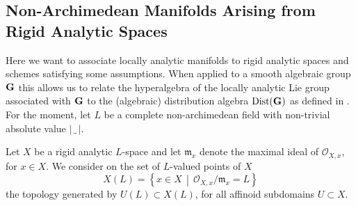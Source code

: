 \documentclass[a4paper, reqno, 10pt]{amsart}
\theoremstyle{definition}
\numberwithin{equation}{section}
\newcommand{\abs}[1]{{\lvert{#1}\rvert}}
\newcommand{\blank}{{\,\_\,}}
\let\originalmiddle\middle
\renewcommand{\middle}[1]{\,\originalmiddle#1\,}
\newcommand{\CO}{{\mathcal {O}}}
\newcommand{\bG}{{\mathrm{\bf G}}}
\newcommand{\Fm}{{\mathfrak {m}}}
\begin{document}
\subsection{Non-Archimedean Manifolds Arising from Rigid Analytic Spaces}


Here we want to associate locally analytic manifolds to rigid analytic spaces and schemes satisfying some assumptions.
When applied to a smooth algebraic group $\bG$ this allows us to relate the hyperalgebra of the locally analytic Lie group associated with $\bG$ to the (algebraic) distribution algebra ${\rm Dist}(\bG)$ as defined in \cite[I.\ \S 7.7]{Jantzen03RepAlgGrp}.
For the moment, let $L$ be a complete non-archimedean field with non-trivial absolute value $\abs{\blank}$.



Let $X$ be a rigid analytic $L$-space and let $\Fm_x$ denote the maximal ideal of $\CO_{X,x}$, for $x\in X$.
We consider on the set of $L$-valued points of $X$
\begin{equation*}
	X(L) = \left\{ x \in X \middle{|} \CO_{X,x}/\Fm_x = L \right\}
\end{equation*}
the topology generated by $U(L)\subset X(L)$, for all affinoid subdomains $U \subset X$.
\end{document}

